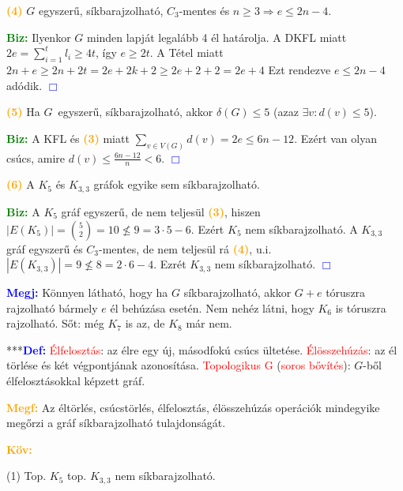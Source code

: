 \documentclass[../../szobeli.tex]{subfiles}
\begin{document}
\begin{itemize}
            \textcolor{orange}{\textbf{(4)}} $G$ egyszerű, síkbarajzolható, $C_3$-mentes és $n \geq 3 \Rightarrow e \leq 2n - 4$. 

            \textcolor{green}{\textbf{Biz:}} Ilyenkor $G$ minden lapját legalább 4 él határolja. A DKFL miatt $2e = \sum_{i=1}^{t}l_i \geq 4t$, így $e \geq 2t$. A Tétel miatt $2n + e \geq 2n + 2t = 2e + 2k + 2 \geq 2e + 2 + 2 = 2e + 4$ Ezt rendezve $e \leq 2n - 4$ adódik. \textcolor{blue}{$\Box$}

            \textcolor{orange}{\textbf{(5)}} Ha $G$ egyszerű, síkbarajzolható, akkor $\delta(G) \leq 5$ (azaz $\exists v : d(v) \leq 5$).

            \textcolor{green}{\textbf{Biz:}} A KFL és \textcolor{orange}{\textbf{(3)}} miatt $\sum_{v\in V(G)}d(v) = 2e \leq 6n - 12$. Ezért van olyan csúcs, amire $d(v) \leq \frac{6n-12}{n} < 6$. \textcolor{blue}{$\Box$}

        \fi

            \textcolor{orange}{\textbf{(6)}} A $K_5$ és $K_{3,3}$ gráfok egyike sem síkbarajzolható.

            \textcolor{green}{\textbf{Biz:}} A $K_5$ gráf egyszerű, de nem teljesül \textcolor{orange}{\textbf{(3)}}, hiszen $|E(K_5)| = \binom{5}{2} = 10 \nleq 9 = 3 \cdot 5 - 6$. Ezért $K_5$ nem síkbarajzolható. A $K_{3,3}$ gráf egyszerű és $C_3$-mentes, de nem teljesül rá \textcolor{orange}{\textbf{(4)}}, u.i. $|E(K_{3,3})| = 9 \nleq 8 = 2 \cdot 6 - 4$. Ezrét $K_{3,3}$ nem síkbarajzolható. \textcolor{blue}{$\Box$}

            \textcolor{blue}{\textbf{Megj:}} Könnyen látható, hogy ha $G$ síkbarajzolható, akkor $G + e$ tóruszra rajzolható bármely $e$ él behúzása esetén. Nem nehéz látni, hogy $K_6$ is tóruszra rajzolható. Sőt: még $K_7$ is az, de $K_8$ már nem. 

            ***\textcolor{blue}{\textbf{Def:}} \textcolor{red}{Élfelosztás}: az élre egy új, másodfokú csúcs ültetése. \textcolor{red}{Élösszehúzás}: az él törlése és két végpontjának azonosítása. \textcolor{red}{Topologikus G} (\textcolor{red}{soros bővítés}): $G$-ből élfelosztásokkal képzett gráf. 

            \textcolor{orange}{\textbf{Megf:}} Az éltörlés, csúcstörlés, élfelosztás, élösszehúzás operációk mindegyike megőrzi a gráf síkbarajzolható tulajdonságát. 

            \textcolor{orange}{\textbf{Köv:}} 
            
                (1) Top. $K_5$ top. $K_{3,3}$ nem síkbarajzolható. 
            

\end{itemize}
\end{document}
